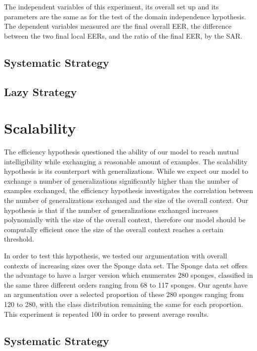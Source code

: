The independent variables of this experiment, its overall set up and its parameters are the same as for the test of the domain independence hypothesis. The dependent variables measured are the final overall EER, the difference between the two final local EERs, and the ratio of the final EER, by the SAR.

\subsection{Systematic Strategy}

\subsection{Lazy Strategy}

\section{Scalability}

The efficiency hypothesis questioned the ability of our model to reach mutual intelligibility while exchanging a reasonable amount of examples. The scalability hypothesis is its counterpart with generalizations. While we expect our model to exchange a number of generalizations significantly higher than the number of examples exchanged, the efficiency hypothesis investigates the correlation between the number of generalizations exchanged and the size of the overall context. Our hypothesis is that if the number of generalizations exchanged increases polynomially with the size of the overall context, therefore our model should be computally efficient once the size of the overall context reaches a certain threshold.

In order to test this hypothesis, we tested our argumentation with overall contexts of increasing sizes over the Sponge data set. The Sponge data set offers the advantage to have a larger version which enumerates 280 sponges, classified in the same three different orders ranging from 68 to 117 sponges. Our agents have an argumentation over a selected proportion of these 280 sponges ranging from 120 to 280, with the class distribution remaining the same for each proportion. This experiment is repeated 100 in order to present average results.


\subsection{Systematic Strategy}

